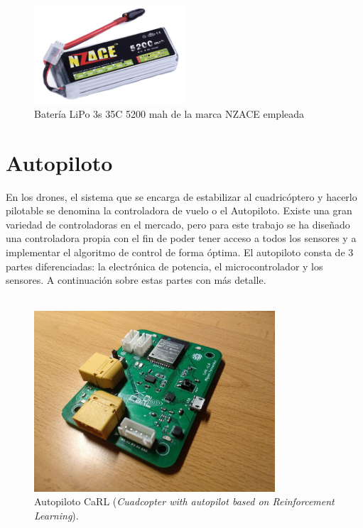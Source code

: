\begin{figure}[htb!]
		\centering
		\includegraphics[width=0.5\textwidth]{hardware/bateriaNZACE}
		\caption{Batería LiPo 3s 35C 5200 mah de la marca NZACE empleada  }
		\label{hardware:Lipo}

\end{figure}


\section{Autopiloto}

En los drones, el sistema que se encarga de estabilizar al cuadricóptero y hacerlo pilotable se denomina la controladora de vuelo o el Autopiloto. Existe una gran variedad de controladoras en el mercado, pero para este trabajo se ha diseñado una controladora propia con el fin de poder tener acceso a todos los sensores y a implementar el algoritmo de control de forma óptima. El autopiloto consta de 3 partes diferenciadas: la electrónica de potencia, el microcontrolador y los sensores. A continuación  sobre estas partes con más detalle.\\


\\

\begin{figure}[htb!]
	\centering
	\includegraphics[width=0.8\textwidth]{hardware/carl_board}
	\caption{Autopiloto CaRL (\textit{Cuadcopter with autopilot based on Reinforcement Learning}).}
	\label{hardware:carl_board}	
\end{figure}




